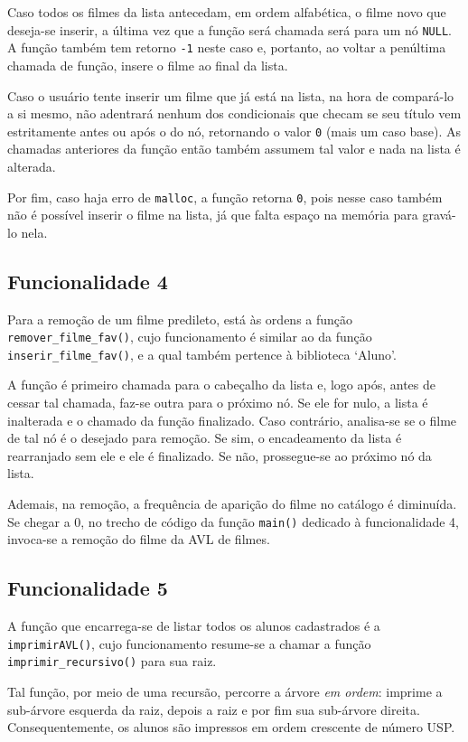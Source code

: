 \documentclass[12pt,a4paper,portuguese]{article}
\begin{document}
        Caso todos os filmes da lista antecedam, em ordem alfabética, o filme novo que deseja-se inserir, a última vez que a função será chamada será para um nó \verb|NULL|. A função também tem retorno \verb|-1| neste caso e, portanto, ao voltar a penúltima chamada de função, insere o filme ao final da lista.

        Caso o usuário tente inserir um filme que já está na lista, na hora de compará-lo a si mesmo, não adentrará nenhum dos condicionais que checam se seu título vem estritamente antes ou após o do nó, retornando o valor \verb|0| (mais um caso base). As chamadas anteriores da função então também assumem tal valor e nada na lista é alterada.

        Por fim, caso haja erro de \verb|malloc|, a função retorna \verb|0|, pois nesse caso também não é possível inserir o filme na lista, já que falta espaço na memória para gravá-lo nela.

    \subsection*{Funcionalidade 4}
        Para a remoção de um filme predileto, está às ordens a função \verb|remover_filme_fav()|, cujo funcionamento é similar ao da função \verb|inserir_filme_fav()|, e a qual também pertence à biblioteca `Aluno'.

        A função é primeiro chamada para o cabeçalho da lista e, logo após, antes de cessar tal chamada, faz-se outra para o próximo nó. Se ele for nulo, a lista é inalterada e o chamado da função finalizado. Caso contrário, analisa-se se o filme de tal nó é o desejado para remoção. Se sim, o encadeamento da lista é rearranjado sem ele e ele é finalizado. Se não, prossegue-se ao próximo nó da lista.

        Ademais, na remoção, a frequência de aparição do filme no catálogo é diminuída. Se chegar a 0, no trecho de código da função \verb|main()| dedicado à funcionalidade 4, invoca-se a remoção do filme da AVL de filmes.
    \subsection*{Funcionalidade 5}
        A função que encarrega-se de listar todos os alunos cadastrados é a \verb|imprimirAVL()|, cujo funcionamento resume-se a chamar a função \verb|imprimir_recursivo()| para sua raiz.
        
        Tal função, por meio de uma recursão, percorre a árvore \textit{em ordem}: imprime a sub-árvore esquerda da raiz, depois a raiz e por fim sua sub-árvore direita. Consequentemente, os alunos são impressos em ordem crescente de número USP.
\end{document}
